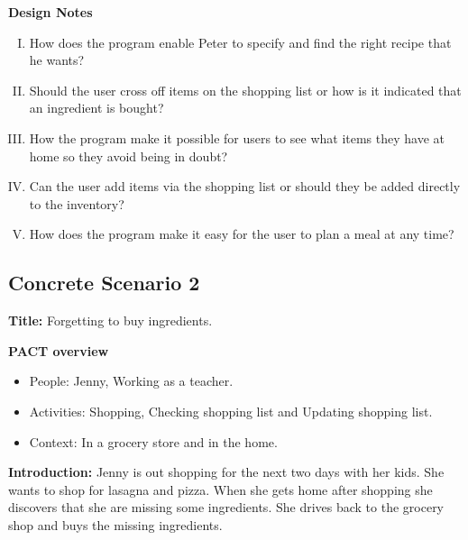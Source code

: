 \textbf{Design Notes}

\begin{enumerate} [(I)]
\item How does the program enable Peter to specify and find the right recipe that he wants?
\item Should the user cross off items on the shopping list or how is it indicated that an ingredient is bought?
\item  How the program make it possible for users to see what items they have at home so they avoid being in doubt?
\item Can the user add items via the shopping list or should they be added directly to the inventory?
\item How does the program make it easy for the user to plan a meal at any time?
\end{enumerate}

\subsection{Concrete Scenario 2}\label{ConcreteScenario2}

\textbf{Title:} Forgetting to buy ingredients.

\textbf{PACT overview}
\begin{itemize}
\item People: Jenny, Working as a teacher.
\item Activities: Shopping, Checking shopping list and Updating shopping list. 
\item Context: In a grocery store and in the home.
\end{itemize}

\textbf{Introduction:} Jenny is out shopping for the next two days with her kids. She wants to shop for lasagna and pizza. When she gets home after shopping she discovers that she are missing some ingredients. She drives back to the grocery shop and buys the missing ingredients. 

